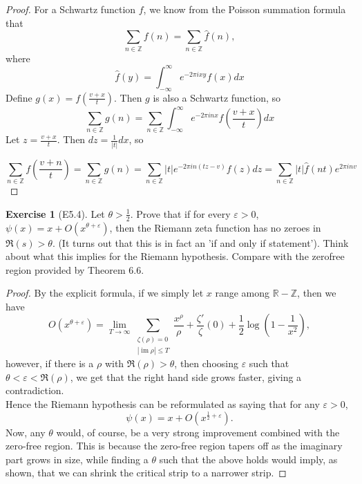 \documentclass[reqno]{amsart}
\theoremstyle{definition}
\newtheorem{exercise}[theorem]{Exercise}
\theoremstyle{remark}
\DeclareMathOperator{\im}{im}
\begin{document}
\begin{proof}
    For a Schwartz function $f$, we know from the
    Poisson summation formula that
    \[
    \sum_{n \in \mathbb{Z}} f(n)
    = \sum_{n \in \mathbb{Z}} \hat{f}(n),
    \] 
    where
    \[
    \hat{f}(y) = \int_{-\infty}^{\infty} 
    e^{-2 \pi i xy} f(x) dx
    \] 
    Define
    $g(x) = f\left( \frac{v+x}{t} \right) $. Then
    $g$ is also a Schwartz function, so
    \[
    \sum_{n\in \mathbb{Z}} g(n) = 
    \sum_{n \in \mathbb{Z}}
    \int_{-\infty}^{\infty} e^{-2 \pi i n x}
    f\left( \frac{v+x}{t} \right) dx
    \] 
    Let
    $z = \frac{v+x}{t}$. Then
    $dz = \frac{1}{\left| t \right|} dx$, so
    
    \[
    \sum_{n \in \mathbb{Z}}
    f\left( \frac{v+n}{t} \right) 
    = \sum_{n \in \mathbb{Z}}g(n)
    = \sum_{n \in \mathbb{Z}}
    \left| t \right|  e^{-2 \pi i n \left( tz-v \right) }
    f(z) dz
    = \sum_{n \in \mathbb{Z}}
    \left| t \right| \hat{f}(nt) e^{2\pi i n v}
    \] 
\end{proof}


\begin{exercise}[E5.4]
    Let $\theta > \frac{1}{2}$. Prove that if
    for every $\varepsilon > 0$, 
    $\psi (x) = x + O\left( x^{\theta + \varepsilon} \right) $,
    then the Riemann zeta function has
    no zeroes in $\Re (s) > \theta$. 
    (It turns out that this is in fact
    an 'if and only if statement'). Think about
    what this implies for the Riemann hypothesis. Compare
    with the zerofree region provided by
    Theorem 6.6.
\end{exercise}

\begin{proof}
    By the explicit formula, if we simply let
    $x$ range among $\mathbb{R} - \mathbb{Z}$, then
    we have
    \[
    O\left( x^{\theta + \varepsilon} \right) 
    = \lim_{T \to \infty} 
    \sum_{\substack{\zeta(\rho) = 0\\ \left| \im \rho \right| 
    \le T}} \frac{x^{\rho}}{\rho }
    + \frac{\zeta'}{\zeta}(0) + \frac{1}{2} 
    \log \left( 1 - \frac{1}{x^2} \right) ,
    \] 
    however, if there is a  $\rho $ with
    $\Re (\rho) > \theta$, then choosing
    $\varepsilon$ such that
    $\theta < \varepsilon < \Re (\rho)$, we get
    that the right hand side grows faster, giving
    a contradiction.\\
    \linebreak
    Hence the Riemann hypothesis can be
    reformulated as saying that
    for any $\varepsilon > 0$,
    \[
    \psi (x) = x + O\left( x^{\frac{1}{2}+ \varepsilon} \right) .
    \] 
    Now, any $\theta$ would, of course, be a very strong improvement
    combined with the zero-free region. This is because
    the zero-free region tapers off as the imaginary
    part grows in size, while
    finding a $\theta$ such that the
    above holds would imply, as shown, that
    we can shrink the critical strip to
    a narrower strip.
\end{proof}
\end{document}

